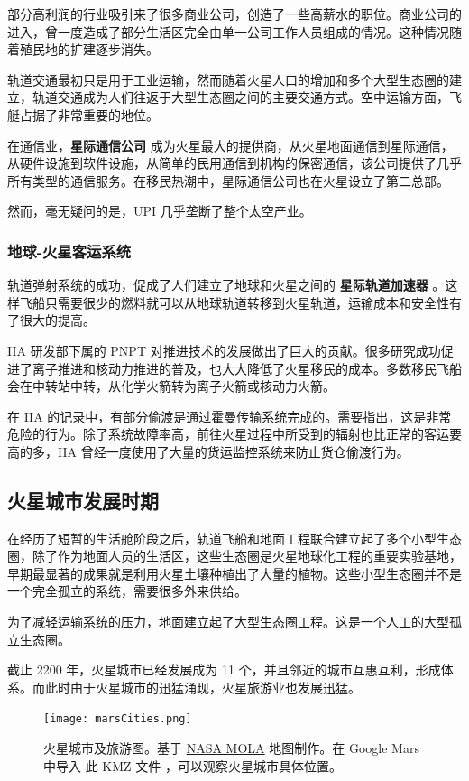 \documentclass[letterpaper,10pt]{sphinxmanual}
\begin{document}
部分高利润的行业吸引来了很多商业公司，创造了一些高薪水的职位。商业公司的进入，曾一度造成了部分生活区完全由单一公司工作人员组成的情况。这种情况随着殖民地的扩建逐步消失。

轨道交通最初只是用于工业运输，然而随着火星人口的增加和多个大型生态圈的建立，轨道交通成为人们往返于大型生态圈之间的主要交通方式。空中运输方面，飞艇占据了非常重要的地位。

在通信业，\textbf{星际通信公司} 成为火星最大的提供商，从火星地面通信到星际通信，从硬件设施到软件设施，从简单的民用通信到机构的保密通信，该公司提供了几乎所有类型的通信服务。在移民热潮中，星际通信公司也在火星设立了第二总部。

然而，毫无疑问的是，UPI 几乎垄断了整个太空产业。


\subsubsection{地球-火星客运系统}
\label{history:id29}
轨道弹射系统的成功，促成了人们建立了地球和火星之间的 \textbf{星际轨道加速器} 。这样飞船只需要很少的燃料就可以从地球轨道转移到火星轨道，运输成本和安全性有了很大的提高。

IIA 研发部下属的 PNPT 对推进技术的发展做出了巨大的贡献。很多研究成功促进了离子推进和核动力推进的普及，也大大降低了火星移民的成本。多数移民飞船会在中转站中转，从化学火箭转为离子火箭或核动力火箭。

在 IIA 的记录中，有部分偷渡是通过霍曼传输系统完成的。需要指出，这是非常危险的行为。除了系统故障率高，前往火星过程中所受到的辐射也比正常的客运要高的多，IIA 曾经一度使用了大量的货运监控系统来防止货仓偷渡行为。


\subsection{火星城市发展时期}
\label{history:id30}
在经历了短暂的生活舱阶段之后，轨道飞船和地面工程联合建立起了多个小型生态圈，除了作为地面人员的生活区，这些生态圈是火星地球化工程的重要实验基地，早期最显著的成果就是利用火星土壤种植出了大量的植物。这些小型生态圈并不是一个完全孤立的系统，需要很多外来供给。

为了减轻运输系统的压力，地面建立起了大型生态圈工程。这是一个人工的大型孤立生态圈。

截止 2200 年，火星城市已经发展成为 11 个，并且邻近的城市互惠互利，形成体系。而此时由于火星城市的迅猛涌现，火星旅游业也发展迅猛。
\begin{figure}[htbp]
\centering
\capstart

\texttt{[image: marsCities.png]}
\caption{火星城市及旅游图。基于 \href{http://mola.gsfc.nasa.gov/images.html}{NASA MOLA} 地图制作。在 Google Mars 中导入 此 KMZ 文件 ，可以观察火星城市具体位置。}\end{figure}
\end{document}
